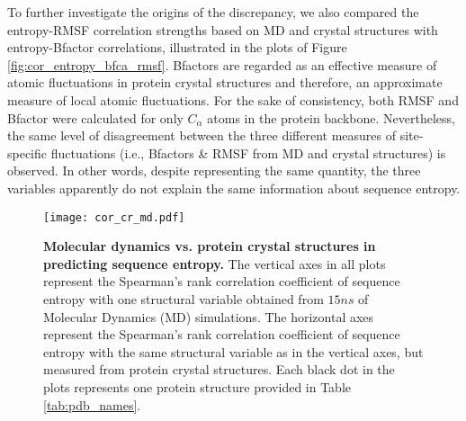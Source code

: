 \documentclass[preprint,12pt]{article}
\begin{document}
        To further investigate the origins of the discrepancy, we also compared the entropy-RMSF correlation strengths based on MD and crystal structures with entropy-Bfactor correlations, illustrated in the plots of Figure \ref{fig:cor_entropy_bfca_rmsf}. Bfactors are regarded as an effective measure of atomic fluctuations in protein crystal structures and therefore, an approximate measure of local atomic fluctuations. For the sake of consistency, both RMSF and Bfactor were calculated for only $C_\alpha$ atoms in the protein backbone. Nevertheless, the same level of disagreement between the three different measures of site-specific fluctuations (i.e., Bfactors \& RMSF from MD and crystal structures) is observed. In other words, despite representing the same quantity, the three variables apparently do not explain the same information about sequence entropy.
        

            \begin{figure*}[t]
            \begin{center}
                \texttt{[image: cor\_cr\_md.pdf]}
            \end{center}
            \caption{
                     {\bf Molecular dynamics vs. protein crystal structures in predicting sequence entropy.}
                     The vertical axes in all plots represent the Spearman's rank correlation coefficient of sequence entropy with one structural variable obtained from $15ns$ of Molecular Dynamics (MD) simulations. The horizontal axes represent the Spearman's rank correlation coefficient of sequence entropy with the same structural variable as in the vertical axes, but measured from protein crystal structures. Each black dot in the plots represents one protein structure provided in Table \ref{tab:pdb_names}. %
                     }
            \label{fig:cor_cr_md}
            \end{figure*}
\end{document}
